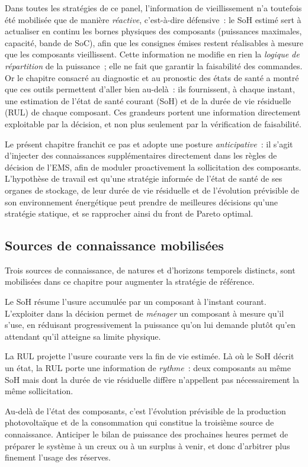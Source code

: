 Dans toutes les stratégies de ce panel, l'information de vieillissement n'a toutefois été mobilisée que de manière \emph{réactive}, c'est-à-dire défensive~: le SoH estimé sert à actualiser en continu les bornes physiques des composants (puissances maximales, capacité, bande de SoC), afin que les consignes émises restent réalisables à mesure que les composants vieillissent. Cette information ne modifie en rien la \emph{logique de répartition} de la puissance~; elle ne fait que garantir la faisabilité des commandes. Or le chapitre consacré au diagnostic et au pronostic des états de santé a montré que ces outils permettent d'aller bien au-delà~: ils fournissent, à chaque instant, une estimation de l'état de santé courant (SoH) et de la durée de vie résiduelle (RUL) de chaque composant. Ces grandeurs portent une information directement exploitable par la décision, et non plus seulement par la vérification de faisabilité.

Le présent chapitre franchit ce pas et adopte une posture \emph{anticipative}~: il s'agit d'injecter des connaissances supplémentaires directement dans les règles de décision de l'EMS, afin de moduler proactivement la sollicitation des composants. L'hypothèse de travail est qu'une stratégie informée de l'état de santé de ses organes de stockage, de leur durée de vie résiduelle et de l'évolution prévisible de son environnement énergétique peut prendre de meilleures décisions qu'une stratégie statique, et se rapprocher ainsi du front de Pareto optimal.

\subsection{Sources de connaissance mobilisées}

Trois sources de connaissance, de natures et d'horizons temporels distincts, sont mobilisées dans ce chapitre pour augmenter la stratégie de référence.

\begin{description}
  \setlength\itemsep{2pt}
  \item[L'état de santé (SoH)~: l'état présent.] Le SoH résume l'usure accumulée par un composant à l'instant courant. L'exploiter dans la décision permet de \emph{ménager} un composant à mesure qu'il s'use, en réduisant progressivement la puissance qu'on lui demande plutôt qu'en attendant qu'il atteigne sa limite physique.
  \item[La durée de vie résiduelle (RUL)~: le futur du composant.] La RUL projette l'usure courante vers la fin de vie estimée. Là où le SoH décrit un état, la RUL porte une information de \emph{rythme}~: deux composants au même SoH mais dont la durée de vie résiduelle diffère n'appellent pas nécessairement la même sollicitation.
  \item[La prévision des profils de puissance~: le futur de l'environnement.] Au-delà de l'état des composants, c'est l'évolution prévisible de la production photovoltaïque et de la consommation qui constitue la troisième source de connaissance. Anticiper le bilan de puissance des prochaines heures permet de préparer le système à un creux ou à un surplus à venir, et donc d'arbitrer plus finement l'usage des réserves.
\end{description}

